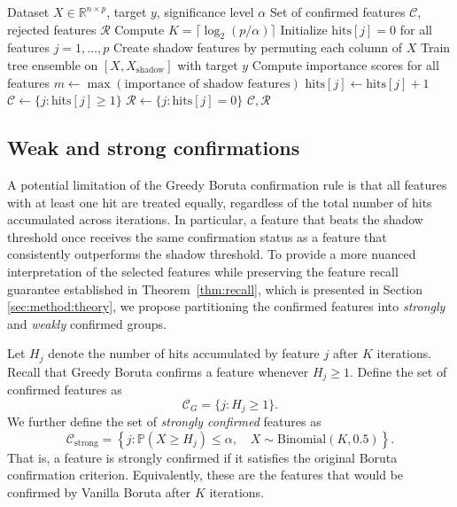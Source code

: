 \documentclass[runningheads]{llncs}
\begin{document}
\begin{algorithm}[t]
\caption{Greedy Boruta Algorithm}
\label{alg:greedy_boruta}
\begin{algorithmic}[1]
\REQUIRE Dataset $X \in \mathbb{R}^{n \times p}$, target $y$, significance level $\alpha$
\ENSURE Set of confirmed features $\mathcal{C}$, rejected features $\mathcal{R}$
\STATE Compute $K = \lceil \log_2(p/\alpha) \rceil$ 
\STATE Initialize $\text{hits}[j] = 0$ for all features $j = 1, \ldots, p$
    \STATE Create shadow features by permuting each column of $X$
    \STATE Train tree ensemble on $[X, X_{\text{shadow}}]$ with target $y$
    \STATE Compute importance scores for all features
    \STATE $m \gets \max(\text{importance of shadow features})$
            \STATE $\text{hits}[j] \gets \text{hits}[j] + 1$
        \ENDIF
    \ENDFOR
\ENDFOR
\STATE $\mathcal{C} \gets \{j : \text{hits}[j] \geq 1\}$ 
\STATE $\mathcal{R} \gets \{j : \text{hits}[j] = 0\}$  
\RETURN $\mathcal{C}, \mathcal{R}$
\end{algorithmic}
\end{algorithm}


\subsection{Weak and strong confirmations}

A potential limitation of the Greedy Boruta confirmation rule is that all features with at least one hit are treated equally, regardless of the total number of hits accumulated across iterations. In particular, a feature that beats the shadow threshold once receives the same confirmation status as a feature that consistently outperforms the shadow threshold. To provide a more nuanced interpretation of the selected features while preserving the feature recall guarantee established in Theorem~\ref{thm:recall}, which is presented in Section \ref{sec:method:theory}, we propose partitioning the confirmed features into \emph{strongly} and \emph{weakly} confirmed groups.

Let \(H_j\) denote the number of hits accumulated by feature \(j\) after \(K\) iterations. Recall that Greedy Boruta confirms a feature whenever \(H_j \geq 1\). Define the set of confirmed features as
\[
\mathcal{C}_G
=
\{j : H_j \geq 1\}.
\]
We further define the set of \emph{strongly confirmed} features as
\[
\mathcal{C}_{\mathrm{strong}}
=
\left\{
j :
\mathbb{P}\!\left(
X \geq H_j
\right)
\leq \alpha,
\quad
X \sim \mathrm{Binomial}(K,0.5)
\right\}.
\]
That is, a feature is strongly confirmed if it satisfies the original Boruta confirmation criterion. Equivalently, these are the features that would be confirmed by Vanilla Boruta after \(K\) iterations. 
\end{document}
